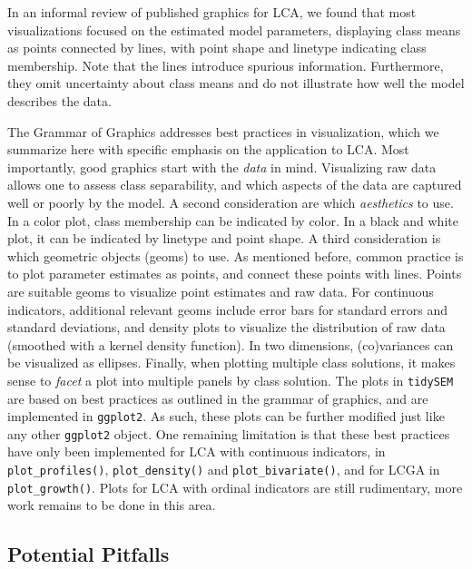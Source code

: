 \documentclass[
  ,man,floatsintext]{apa6}
\begin{document}
In an informal review of published graphics for LCA,
we found that most visualizations focused on the estimated model parameters,
displaying class means as points connected by lines, with point shape and linetype indicating class membership.
Note that the lines introduce spurious information.
Furthermore, they omit uncertainty about class means and do not illustrate how well the model describes the data.

The Grammar of Graphics addresses best practices in visualization, which we summarize here with specific emphasis on the application to LCA.
Most importantly, good graphics start with the \emph{data} in mind.
Visualizing raw data allows one to assess class separability,
and which aspects of the data are captured well or poorly by the model.
A second consideration are which \emph{aesthetics} to use.
In a color plot, class membership can be indicated by color.
In a black and white plot, it can be indicated by linetype and point shape.
A third consideration is which geometric objects (geoms) to use.
As mentioned before, common practice is to plot parameter estimates as points, and connect these points with lines.
Points are suitable geoms to visualize point estimates and raw data.
For continuous indicators, additional relevant geoms include error bars for standard errors and standard deviations,
and density plots to visualize the distribution of raw data (smoothed with a kernel density function).
In two dimensions, (co)variances can be visualized as ellipses.
Finally, when plotting multiple class solutions,
it makes sense to \emph{facet} a plot into multiple panels by class solution.
The plots in \texttt{tidySEM} are based on best practices as outlined in the grammar of graphics,
and are implemented in \texttt{ggplot2}.
As such, these plots can be further modified just like any other \texttt{ggplot2} object.
One remaining limitation is that these best practices have only been implemented for LCA with continuous indicators, in \texttt{plot\_profiles()}, \texttt{plot\_density()} and \texttt{plot\_bivariate()}, and for LCGA in \texttt{plot\_growth()}. Plots for LCA with ordinal indicators are still rudimentary, more work remains to be done in this area.

\hypertarget{potential-pitfalls}{%
\subsection{Potential Pitfalls}\label{potential-pitfalls}}
\end{document}
